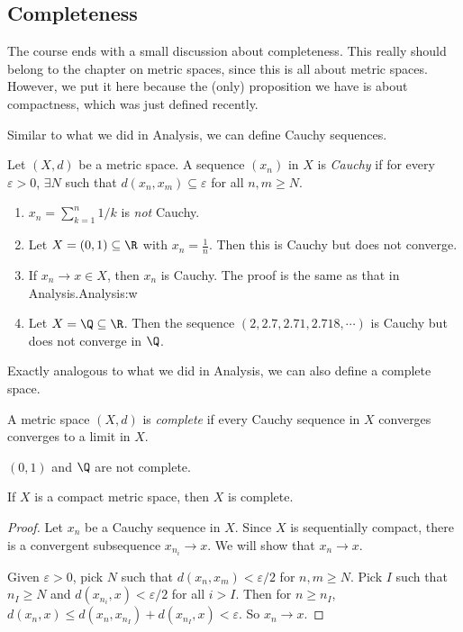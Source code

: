 \documentclass[a4paper]{article}
\begin{document}
\subsection{Completeness}
The course ends with a small discussion about completeness. This really should belong to the chapter on metric spaces, since this is all about metric spaces. However, we put it here because the (only) proposition we have is about compactness, which was just defined recently.

Similar to what we did in Analysis, we can define Cauchy sequences.
\begin{defi}
  Let $(X, d)$ be a metric space. A sequence $(x_n)$ in $X$ is \emph{Cauchy} if for every $\varepsilon > 0$, $\exists N$ such that $d(x_n, x_m) \subseteq \varepsilon$ for all $n, m \geq N$.
\end{defi}

\begin{eg}\leavevmode
  \begin{enumerate}
    \item $x_n = \sum_{k = 1}^n 1/k$ is \emph{not} Cauchy.
    \item Let $X = (0, 1) \subseteq \R$ with $x_n = \frac{1}{n}$. Then this is Cauchy but does not converge.
    \item If $x_n \to x\in X$, then $x_n$ is Cauchy. The proof is the same as that in Analysis.Analysis:w

    \item Let $X = \Q \subseteq \R$. Then the sequence $(2, 2.7, 2.71, 2.718, \cdots)$ is Cauchy but does not converge in $\Q$.
  \end{enumerate}
\end{eg}

Exactly analogous to what we did in Analysis, we can also define a complete space.
\begin{defi}
  A metric space $(X, d)$ is \emph{complete} if every Cauchy sequence in $X$ converges converges to a limit in $X$.
\end{defi}

\begin{eg}
  $(0, 1)$ and $\Q$ are not complete.
\end{eg}

\begin{prop}
  If $X$ is a compact metric space, then $X$ is complete.
\end{prop}

\begin{proof}
  Let $x_n$ be a Cauchy sequence in $X$. Since $X$ is sequentially compact, there is a convergent subsequence $x_{n_i}\to x$. We will show that $x_n \to x$.

  Given $\varepsilon > 0$, pick $N$ such that $d(x_n, x_m) < \varepsilon/2$ for $n,m \geq N$. Pick $I$ such that $n_I \geq N$ and $d(x_{n_i}, x) < \varepsilon/2$ for all $i> I$. Then for $n \geq n_I$, $d(x_n, x) \leq d(x_n, x_{n_I}) + d(x_{n_I}, x) < \varepsilon$. So $x_n \to x$.
\end{proof}
\end{document}
